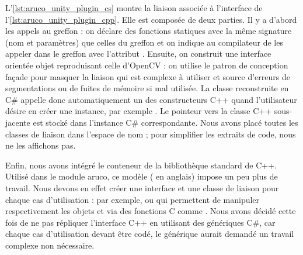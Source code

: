 L'\autoref{lst:aruco_unity_plugin_cs} montre la liaison associée à l'interface de l'\autoref{lst:aruco_unity_plugin_cpp}. Elle est composée de deux parties. Il y a d'abord les appels au greffon : on déclare des fonctions statiques avec la même signature (nom et paramètres) que celles du greffon et on indique au compilateur de les appeler dans le greffon avec l'attribut . Ensuite, on construit une interface orientée objet reproduisant celle d'OpenCV : on utilise le patron de conception façade pour masquer la liaison qui est complexe à utiliser et source d'erreurs de segmentations ou de fuites de mémoire si mal utilisée. La classe  reconstruite en C\# appelle donc automatiquement un des constructeurs C++ quand l'utilisateur désire en créer une instance, par exemple . Le pointeur vers la classe C++ sous-jacente est stocké dans l'instance C\# correspondante. Nous avons placé toutes les classes de liaison dans l'espace de nom  ; pour simplifier les extraits de code, nous ne les affichons pas.

Enfin, nous avons intégré le conteneur  de la bibliothèque standard de C++. Utilisé dans le module aruco, ce modèle ( en anglais) impose un peu plus de travail. Nous devons en effet créer une interface et une classe de liaison pour chaque cas d'utilisation : par exemple,  ou  qui permettent de manipuler respectivement les objets  et  via des fonctions C comme . Nous avons décidé cette fois de ne pas répliquer l'interface C++ en utilisant des génériques C\#, car chaque cas d'utilisation devant être codé, le générique aurait demandé un travail complexe non nécessaire.


